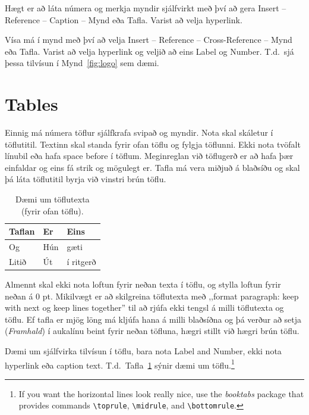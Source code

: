 \documentclass[a4paper,12pt,twoside,BCOR=10mm]{scrbook}
\begin{document}
Hægt er að láta númera og merkja myndir sjálfvirkt með því að gera Insert – Reference – Caption – Mynd eða Tafla. Varist að velja hyperlink. 

Vísa má í mynd með því að velja Insert – Reference – Cross-Reference – Mynd eða Tafla. Varist að velja hyperlink og veljið að eins Label og Number. T.d.\ sjá þessa tilvísun í Mynd~\ref{fig:logo} sem dæmi. 

\section{Tables}
Einnig má númera töflur sjálfkrafa svipað og myndir. Nota skal skáletur í töflutitil. Textinn skal standa fyrir ofan töflu og fylgja töflunni.  Ekki nota tvöfalt línubil eða hafa space before í töflum. Meginreglan við töflugerð er að hafa þær einfaldar og eins fá strik og mögulegt er. Tafla má vera miðjuð á blaðsíðu og skal þá láta töflutitil byrja við vinstri brún töflu.


\begin{table}[htb]
  \centering
  \caption{Dæmi um töflutexta (fyrir ofan töflu).}
  \sffamily
  \begin{tabularx}{0.9\textwidth}{ p{4.0cm}  p{4.0cm}  p{4.0cm} }
    \hline
   \textbf{Taflan} \hfill & \textbf{Er} \hfill & \textbf{Eins} \\ \hline
    Og & Hún & gæti\\
    Litið & Út & í ritgerð\\ \hline
  \end{tabularx} \normalfont
  \label{table:Emissivity}
\end{table}

Almennt skal ekki nota loftun fyrir neðan texta í töflu, og stylla loftun fyrir neðan á 0 pt.
Mikilvægt er að skilgreina töflutexta með ,,format paragraph: keep with next og keep lines together” til að rjúfa ekki tengsl á milli töflutexta og töflu. Ef tafla er mjög löng má kljúfa hana á milli blaðsíðna og þá verður að setja (\textit{Framhald}) í aukalínu beint fyrir neðan töfluna, hægri stillt við hægri brún töflu.

Dæmi um sjálfvirka tilvísun í töflu, bara nota Label and Number, ekki nota hyperlink eða caption text. T.d.\ Tafla~\ref{table:Emissivity} sýnir dæmi um töflu.\footnote{If you want the horizontal lines look really nice, use the \emph{booktabs} package that provides commands \texttt{\textbackslash{}toprule}, \texttt{\textbackslash{}midrule}, and \texttt{\textbackslash{}bottomrule}.}
\end{document}
